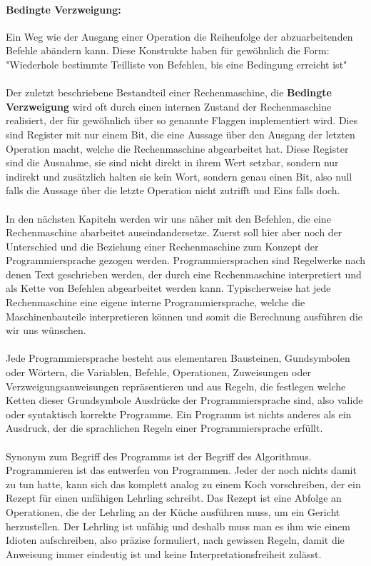\documentclass[11pt,a4paper,leqno]{report}
\numberwithin{equation}{chapter}
\begin{document}
\paragraph{Bedingte Verzweigung:} Ein Weg wie der Ausgang einer Operation die Reihenfolge der abzuarbeitenden Befehle abändern kann. Diese Konstrukte haben für gewöhnlich die Form: "Wiederhole bestimmte Teilliste von Befehlen, bis eine Bedingung erreicht ist"
\\
\\
Der zuletzt beschriebene Bestandteil einer Rechenmaschine, die \textbf{Bedingte Verzweigung} wird oft durch einen internen Zustand der Rechenmaschine realisiert, der für gewöhnlich über so genannte Flaggen implementiert wird. Dies sind Register mit nur einem Bit, die eine Aussage über den Ausgang der letzten Operation macht, welche die Rechenmaschine abgearbeitet hat. Diese Register sind die Ausnahme, sie sind nicht direkt in ihrem Wert setzbar, sondern nur indirekt und zusätzlich halten sie kein Wort, sondern genau einen Bit, also null falls die Aussage über die letzte Operation nicht zutrifft und Eins falls doch.\\
\\
In den nächsten Kapiteln werden wir uns näher mit den Befehlen, die eine Rechenmaschine abarbeitet auseindandersetze. Zuerst soll hier aber noch der Unterschied und die Beziehung einer Rechenmaschine zum Konzept der Programmiersprache gezogen werden. Programmiersprachen sind Regelwerke nach denen  Text geschrieben werden, der durch eine Rechenmaschine interpretiert und als Kette von Befehlen abgearbeitet werden kann.
Typischerweise hat jede Rechenmaschine eine eigene interne Programmiersprache, welche die Maschinenbauteile interpretieren können und somit die Berechnung ausführen die wir uns wünschen.\\
\\
Jede Programmiersprache besteht aus elementaren Bausteinen, Gundsymbolen oder Wörtern, die Variablen, Befehle, Operationen, Zuweisungen oder\\ Verzweigungsanweisungen repräsentieren und aus Regeln, die festlegen welche Ketten dieser Grundsymbole Ausdrücke der Programmiersprache sind, also valide oder syntaktisch korrekte Programme. Ein Programm ist nichts anderes als ein Ausdruck, der die sprachlichen Regeln einer Programmiersprache erfüllt.\\
\\
Synonym zum Begriff des Programms ist der Begriff des Algorithmus. \\
Programmieren ist das entwerfen von Programmen. Jeder der noch nichts damit zu tun hatte, kann sich das komplett analog zu einem Koch vorschreiben, der ein Rezept für einen unfähigen Lehrling schreibt. Das Rezept ist eine Abfolge an Operationen, die der Lehrling an der Küche ausführen muss, um ein Gericht herzustellen. Der Lehrling ist unfähig und deshalb muss man es ihm wie einem Idioten aufschreiben, also präzise formuliert, nach gewissen Regeln, damit die Anweisung immer eindeutig ist und keine Interpretationsfreiheit zulässt. 
\end{document}
